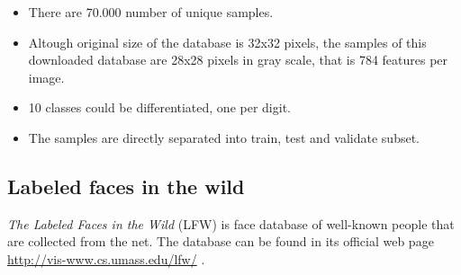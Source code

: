 \begin{itemize}
 \item There are 70.000 number of unique samples.
 \item Altough original size of the database is 32x32 pixels, the samples of this downloaded database are 28x28 pixels in gray scale, that is 784 features per image.
 \item 10 classes could be differentiated, one per digit.
\item The samples are directly separated into train, test and validate subset.
\end{itemize}

\subsection{Labeled faces in the wild}
\textit{The Labeled Faces in the Wild} (LFW) is face database of well-known people that are collected from the net. The database can be found in its official web page \url{http://vis-www.cs.umass.edu/lfw/} \cite{LFWTech}.\\

